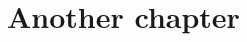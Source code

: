 \chapter{Another chapter}
\startcontents[chapters]
\Mprintcontents


\begin{subappendices}

\end{subappendices}


\stopcontents[chapters]